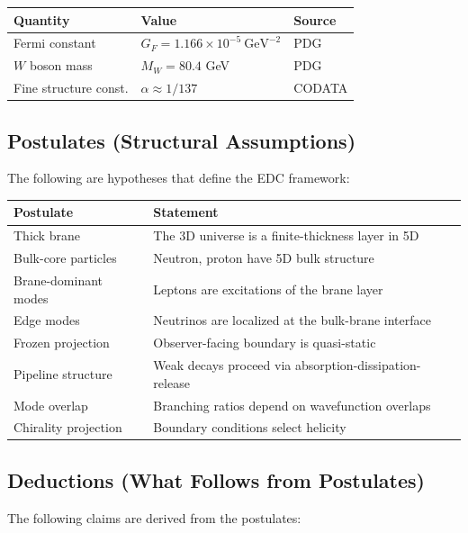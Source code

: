 \begin{center}
\begin{tabular}{lll}
\toprule
\textbf{Quantity} & \textbf{Value} & \textbf{Source} \\
\midrule
Fermi constant & $G_F = 1.166 \times 10^{-5}~\text{GeV}^{-2}$ & PDG \\
$W$ boson mass & $M_W = 80.4$ GeV & PDG \\
Fine structure const. & $\alpha \approx 1/137$ & CODATA \\
\bottomrule
\end{tabular}
\end{center}

\subsection{Postulates (Structural Assumptions)}

The following are hypotheses that define the EDC framework:

\begin{center}
\begin{tabular}{p{4cm}p{9cm}}
\toprule
\textbf{Postulate} & \textbf{Statement} \\
\midrule
Thick brane & The 3D universe is a finite-thickness layer in 5D \\
Bulk-core particles & Neutron, proton have 5D bulk structure \\
Brane-dominant modes & Leptons are excitations of the brane layer \\
Edge modes & Neutrinos are localized at the bulk-brane interface \\
Frozen projection & Observer-facing boundary is quasi-static \\
Pipeline structure & Weak decays proceed via absorption-dissipation-release \\
Mode overlap & Branching ratios depend on wavefunction overlaps \\
Chirality projection & Boundary conditions select helicity \\
\bottomrule
\end{tabular}
\end{center}

\subsection{Deductions (What Follows from Postulates)}

The following claims are derived from the postulates:

